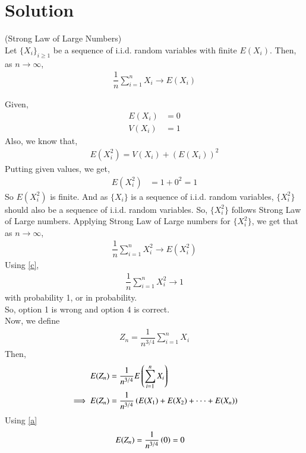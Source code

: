 \documentclass[journal,12pt,twocolumn]{IEEEtran}
\begin{document}
\section{Solution}
\begin{theorem} (Strong Law of Large Numbers)\\
    Let $\{X_i\}_{i \geq 1}$ be a sequence of i.i.d. random variables with finite $E(X_i)$. Then, as $n \to \infty$,
    \begin{align}
        \dfrac{1}{n}\sum_{i=1}^nX_i \to E(X_i)
    \end{align}
\end{theorem}
Given,
\begin{align} 
    E(X_i)&=0 
    \label{a}\\
    V(X_i)&=1
    \label{b}
\end{align}
Also, we know that,
\begin{align}
    E(X_i^2)=V(X_i)+(E(X_i))^2
\end{align}
Putting given values, we get,
\begin{align} \label{c}
    E(X_i^2)&=1+0^2=1
\end{align}
So $E(X_i^2)$ is finite. And as $\{X_i\}$ is a sequence of i.i.d. random variables, $\{X_i^2\}$ should also be a sequence of i.i.d. random variables. So, $\{X_i^2\}$ follows Strong Law of Large numbers.
\newpage
Applying Strong Law of Large numbers for $\{X_i^2\}$, we get that as $n \to \infty$,
\begin{align}
    \dfrac{1}{n}\sum_{i=1}^nX_i^2 \to E(X_i^2)
\end{align}
Using \eqref{c},
\begin{align}
    \dfrac{1}{n}\sum_{i=1}^nX_i^2 \to 1
\end{align}
with probability 1, or in probability.\\
So, option 1 is wrong and option 4 is correct.\vspace{0.3cm}\\
Now, we define
\begin{align}
    Z_n=\dfrac{1}{n^{3/4}}\sum_{i=1}^nX_i
\end{align}
Then,
\begin{align}
    E(Z_n) &= \dfrac{1}{n^{3/4}}E\left(\sum_{i=1}^nX_i\right) \\
    \implies E(Z_n) &= \dfrac{1}{n^{3/4}}\left(E(X_1)+E(X_2)+ \cdot \cdot \cdot +E(X_n)\right)
\end{align}
Using \eqref{a}
\begin{align}
    E(Z_n) &= \dfrac{1}{n^{3/4}}\left(0\right) =0
\end{align}
\end{document}
